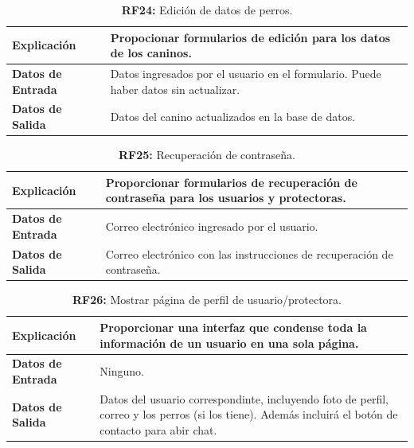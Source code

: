 \documentclass[a4paper, 12pt]{article}
\begin{document}
\begin{table}[H]
\captionsetup{justification=raggedright,singlelinecheck=false}
\caption{\textbf{RF24:} Edición de datos de perros.}
\label{tab:RF24}
	\begin{tabular}{|m{5cm}|m{10cm}|}
	\hline
	\textbf{Explicación} & Propocionar formularios de edición para los datos de los caninos. \\ 
	\hline
	\textbf{Datos de Entrada} &  Datos ingresados por el usuario en el formulario. Puede haber datos sin actualizar.  \\ 
	\hline
	\textbf{Datos de Salida} &   Datos del canino actualizados en la base de datos. \\ 
	\hline
\end{tabular}
\end{table}

\begin{table}[H]
\captionsetup{justification=raggedright,singlelinecheck=false}
\caption{\textbf{RF25:} Recuperación de contraseña.}
\label{tab:RF25}
	\begin{tabular}{|m{5cm}|m{10cm}|}
	\hline
	\textbf{Explicación} & Proporcionar formularios de recuperación de contraseña para los usuarios y protectoras. \\ 
	\hline
	\textbf{Datos de Entrada} & Correo electrónico ingresado por el usuario. \\ 
	\hline
	\textbf{Datos de Salida} & Correo electrónico con las instrucciones de recuperación de contraseña. \\ 
	\hline
\end{tabular}
\end{table}

\begin{table}[H]
\captionsetup{justification=raggedright,singlelinecheck=false}
\caption{\textbf{RF26:} Mostrar página de perfil de usuario/protectora.}
\label{tab:RF26}
	\begin{tabular}{|m{5cm}|m{10cm}|}
	\hline
	\textbf{Explicación} & Proporcionar una interfaz que condense toda la información de un usuario en una sola página. \\ 
	\hline
	\textbf{Datos de Entrada} & Ninguno. \\ 
	\hline
	\textbf{Datos de Salida} & Datos del usuario correspondinte, incluyendo foto de perfil, correo y los perros (si los tiene). Además incluirá el botón de contacto para abir chat. \\ 
	\hline
\end{tabular}
\end{table}
\end{document}
